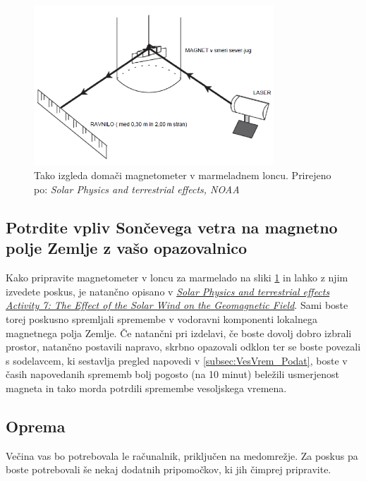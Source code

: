 \begin{figure}
	\centering
	\includegraphics[height=6cm]{Vaje/VesoljVreme/figs/Eksp.png}
	\caption{Tako izgleda domači magnetometer v marmeladnem loncu. Prirejeno po: \textit{Solar Physics and terrestrial effects, NOAA}}
	\label{fig:VesVr_Eksp}       %
\end{figure}
 
\subsection{Potrdite vpliv Sončevega vetra na magnetno polje Zemlje z vašo opazovalnico}
\label{subsec:VesVrem_Posk}
Kako pripravite magnetometer v loncu za marmelado na sliki \ref{fig:VesVr_Eksp} in lahko z njim izvedete poskus, je natančno opisano v \href{http://www.swpc.noaa.gov/sites/default/files/images/u33/Activity_7.pdf}{\textit{Solar Physics and terrestrial effects Activity 7: The Effect of the Solar Wind on the Geomagnetic Field}}. Sami boste torej poskusno spremljali spremembe v vodoravni komponenti lokalnega magnetnega polja Zemlje. Če natančni pri izdelavi, če boste dovolj dobro izbrali prostor, natančno postavili napravo, skrbno opazovali odklon ter se boste povezali s sodelavcem, ki sestavlja pregled napovedi v \ref{subsec:VesVrem_Podat}, boste v časih napovedanih sprememb bolj pogosto (na 10 minut) beležili usmerjenost magneta in tako morda potrdili spremembe vesoljskega vremena.


\subsection{Oprema}
\label{subsec:VesVrem_Oprema}
Večina vas bo potrebovala le računalnik, priključen na medomrežje. Za poskus pa boste potrebovali še nekaj dodatnih pripomočkov, ki jih čimprej pripravite.

